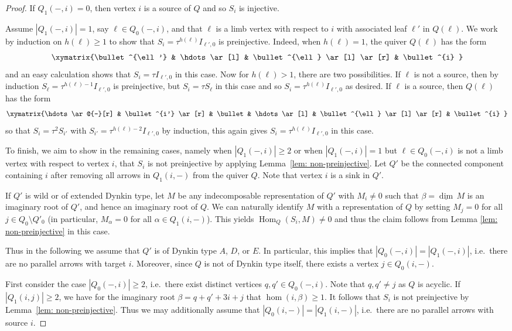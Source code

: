 \documentclass{amsart}
\numberwithin{equation}{section}
\newcommand\udim{{\underline{\dim}\, }}
\newcommand{\Hom}{\operatorname{Hom}}
\begin{document}
\begin{proof}
  If $Q_1(-,i)=0$, then vertex $i$ is a source of $Q$ and so $S_i$ is injective.

  Assume $|Q_1(-,i)|=1$, say $\ell\in Q_0(-,i)$, and that $\ell$ is a limb vertex with respect to $i$ with associated leaf $\ell'$ in $Q(\ell)$.
  We work by induction on $h(\ell)\ge1$ to show that $S_i=\tau^{h(\ell)}I_{\ell',0}$ is preinjective.
  Indeed, when $h(\ell)=1$, the quiver $Q(\ell)$ has the form
  \[\xymatrix{\bullet^{\ell'} & \hdots \ar[l] & \bullet^{\ell} \ar[l] \ar[r] & \bullet^{i} }\]
  and an easy calculation shows that $S_i=\tau I_{\ell',0}$ in this case.
  Now for $h(\ell)>1$, there are two possibilities.
  If $\ell$ is not a source, then by induction $S_\ell=\tau^{h(\ell)-1}I_{\ell',0}$ is preinjective, but $S_i=\tau S_\ell$ in this case and so $S_i=\tau^{h(\ell)}I_{\ell',0}$ as desired.
  If $\ell$ is a source, then $Q(\ell)$ has the form
  \[\xymatrix{\hdots \ar@{-}[r] & \bullet^{i'} \ar[r] & \bullet & \hdots \ar[l] & \bullet^{\ell} \ar[l] \ar[r] & \bullet^{i} }\]
  so that $S_i=\tau^2 S_{i'}$ with $S_{i'}=\tau^{h(\ell)-2} I_{\ell',0}$ by induction, this again gives $S_i=\tau^{h(\ell)} I_{\ell',0}$ in this case.

  To finish, we aim to show in the remaining cases, namely when $|Q_1(-,i)|\ge2$ or when $|Q_1(-,i)|=1$ but $\ell\in Q_0(-,i)$ is not a limb vertex with respect to vertex $i$, that $S_i$ is not preinjective by applying Lemma~\ref{lem: non-preinjective}. 
  Let $Q'$ be the connected component containing $i$ after removing all arrows in $Q_1(i,-)$ from the quiver $Q$.
  Note that vertex $i$ is a sink in $Q'$.

  If $Q'$ is wild or of extended Dynkin type, let $M$ be any indecomposable representation of $Q'$ with $M_i\neq 0$ such that $\beta=\udim M$ is an imaginary root of $Q'$, and hence an imaginary root of $Q$. 
  We can naturally identify $M$ with a representation of $Q$ by setting $M_j=0$ for all $j\in Q_0\setminus Q'_0$ (in particular, $M_\alpha=0$ for all $\alpha\in Q_1(i,-)$).
  This yields $\Hom_Q(S_i,M)\neq 0$ and thus the claim follows from Lemma \ref{lem: non-preinjective} in this case. 

  Thus in the following we assume that $Q'$ is of Dynkin type $A$, $D$, or $E$.
  In particular, this implies that $|Q_0(-,i)|=|Q_1(-,i)|$, i.e.~there are no parallel arrows with target $i$.
  Moreover, since $Q$ is not of Dynkin type itself, there exists a vertex $j\in Q_0(i,-)$.  
	
  First consider the case $|Q_0(-,i)|\geq 2$, i.e.~there exist distinct vertices $q,q'\in Q_0(-,i)$.
  Note that $q,q'\neq j$ as $Q$ is acyclic. 
  If $|Q_1(i,j)|\geq 2$, we have for the imaginary root $\beta=q+q'+3i+j$ that $\hom(i,\beta)\geq 1$.
  It follows that $S_i$ is not preinjective by Lemma~\ref{lem: non-preinjective}.
  Thus we may additionally assume that $|Q_0(i,-)|=|Q_1(i,-)|$, i.e.~there are no parallel arrows with source $i$.


\end{proof}
\end{document}
